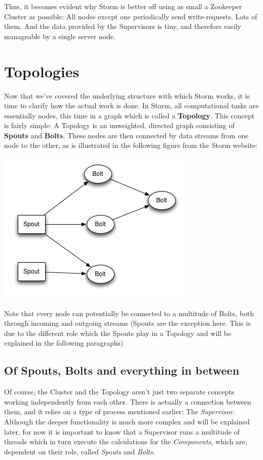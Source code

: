 \documentclass[12pt,a4paper]{article}
\begin{document}
Thus, it becomes evident why Storm is better off using as small a Zookeeper Cluster as possible: All nodes except one periodically send write-requests. Lots of them. And the data provided by the Supervisors is tiny, and therefore easily manageable by a single server node.

\section{Topologies}

Now that we've covered the underlying structure with which Storm works, it is time to clarify how the actual work is done. In Storm, all computational tasks are essentially nodes, this time in a graph which is called a \textbf{Topology}. This concept is fairly simple: A Topology is an unweighted, directed graph consisting of \textbf{Spouts} and \textbf{Bolts}. These nodes are then connected by data streams from one node to the other, as is illustrated in the following figure from the Storm website:\\
\begin{center}
\includegraphics[scale=0.7]{images/topology.png}
\end{center}
Note that every node can potentially be connected to a multitude of Bolts, both through incoming and outgoing streams (Spouts are the exception here. This is due to the different role which the Spouts play in a Topology and will be explained in the following paragraphs)

\subsection{Of Spouts, Bolts and everything in between}

Of course, the Cluster and the Topology aren't just two separate concepts working independently from each other. There is actually a connection between them, and it relies on a type of process mentioned earlier: The \textit{Supervisor}. Although the deeper functionality is much more complex and will be explained later, for now it is important to know that a Supervisor runs a multitude of threads which in turn execute the calculations for the \textit{Components}, which are, dependent on their role, called \textit{Spouts} and \textit{Bolts}.\\
\end{document}
